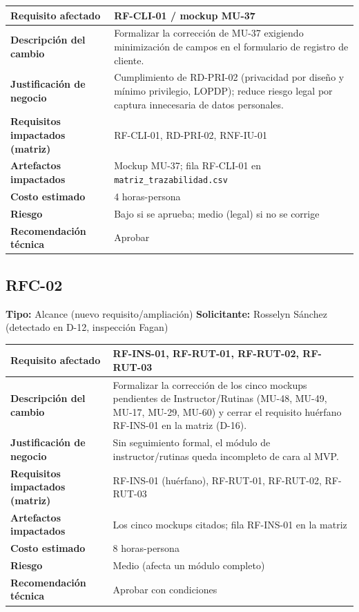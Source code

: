 \documentclass[11pt,a4paper]{article}
\begin{document}
\renewcommand{\arraystretch}{1.25}
\begin{tabularx}{\textwidth}{|>{\bfseries\RaggedRight\arraybackslash}p{4.6cm}|Y|}
\hline
Requisito afectado & RF-CLI-01 / mockup MU-37 \\ \hline
Descripción del cambio & Formalizar la corrección de MU-37 exigiendo minimización de campos en el formulario de registro de cliente. \\ \hline
Justificación de negocio & Cumplimiento de RD-PRI-02 (privacidad por diseño y mínimo privilegio, LOPDP); reduce riesgo legal por captura innecesaria de datos personales. \\ \hline
Requisitos impactados (matriz) & RF-CLI-01, RD-PRI-02, RNF-IU-01 \\ \hline
Artefactos impactados & Mockup MU-37; fila RF-CLI-01 en \texttt{matriz\_trazabilidad.csv} \\ \hline
Costo estimado & 4 horas-persona \\ \hline
Riesgo & Bajo si se aprueba; medio (legal) si no se corrige \\ \hline
Recomendación técnica & Aprobar \\ \hline
\end{tabularx}

\subsection{RFC-02}
\textbf{Tipo:} Alcance (nuevo requisito/ampliación) \quad \textbf{Solicitante:} Rosselyn Sánchez (detectado en D-12, inspección Fagan)

\renewcommand{\arraystretch}{1.25}
\begin{tabularx}{\textwidth}{|>{\bfseries\RaggedRight\arraybackslash}p{4.6cm}|Y|}
\hline
Requisito afectado & RF-INS-01, RF-RUT-01, RF-RUT-02, RF-RUT-03 \\ \hline
Descripción del cambio & Formalizar la corrección de los cinco mockups pendientes de Instructor/Rutinas (MU-48, MU-49, MU-17, MU-29, MU-60) y cerrar el requisito huérfano RF-INS-01 en la matriz (D-16). \\ \hline
Justificación de negocio & Sin seguimiento formal, el módulo de instructor/rutinas queda incompleto de cara al MVP. \\ \hline
Requisitos impactados (matriz) & RF-INS-01 (huérfano), RF-RUT-01, RF-RUT-02, RF-RUT-03 \\ \hline
Artefactos impactados & Los cinco mockups citados; fila RF-INS-01 en la matriz \\ \hline
Costo estimado & 8 horas-persona \\ \hline
Riesgo & Medio (afecta un módulo completo) \\ \hline
Recomendación técnica & Aprobar con condiciones \\ \hline
\end{tabularx}
\end{document}
